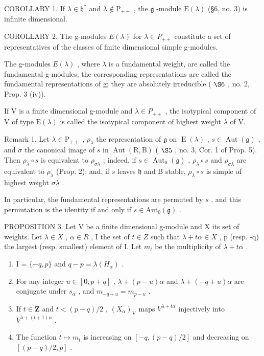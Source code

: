 COROLLARY 1. If \(\lambda \in \mathfrak{h}^*\) and \(\lambda \notin \mathrm{P}_{++}\) , the \(\mathfrak{g}\) -module \(\mathrm{E}(\lambda)\) (§6, no. 3) is infinite dimensional.

COROLLARY 2. The g-modules \(E(\lambda)\) for \(\lambda \in P_{++}\) constitute a set of representatives of the classes of finite dimensional simple g-modules.

The g-modules \(E(\lambda)\) , where \(\lambda\) is a fundamental weight, are called the fundamental g-modules; the corresponding representations are called the fundamental representations of g; they are absolutely irreducible ( \(\S6\) , no. 2, Prop. 3 (iv)).

If V is a finite dimensional g-module and \(\lambda\in P_{++}\) , the isotypical component of V of type \(\mathrm{E}(\lambda)\) is called the isotypical component of highest weight \(\lambda\) of V.

Remark 1. Let \(\lambda \in \mathrm{P}_{++}\) , \(\rho_{\lambda}\) the representation of \(\mathfrak{g}\) on \(\operatorname{E}(\lambda)\) , \(s \in \operatorname{Aut}(\mathfrak{g})\) , and \(\sigma\) the canonical image of \(s\) in \(\operatorname{Aut}(\mathrm{R},\mathrm{B})\) ( \(\S 5\) , no. 3, Cor. 1 of Prop. 5). Then \(\rho_{\lambda} \circ s\) is equivalent to \(\rho_{\sigma \lambda}\) ; indeed, if \(s \in \operatorname{Aut}_0(\mathfrak{g})\) , \(\rho_{\lambda} \circ s\) and \(\rho_{\sigma \lambda}\) are equivalent to \(\rho_{\lambda}\) (Prop. 2); and, if \(s\) leaves \(\mathfrak{h}\) and B stable, \(\rho_{\lambda} \circ s\) is simple of highest weight \(\sigma \lambda\) .

In particular, the fundamental representations are permuted by \(s\) , and this permutation is the identity if and only if \(s \in \mathrm{Aut}_0(\mathfrak{g})\) .

PROPOSITION 3. Let V be a finite dimensional g-module and X its set of weights. Let \(\lambda \in X\) , \(\alpha \in R\) , I the set of \(t \in Z\) such that \(\lambda + t\alpha \in X\) , p (resp. -q) the largest (resp. smallest) element of I. Let \(m_t\) be the multiplicity of \(\lambda + t\alpha\) .

\begin{enumerate}
\def\labelenumi{(\roman{enumi})}
\item
  I = \(\{-q, p\}\) and \(q - p = \lambda(H_{\alpha})\) .
\item
  For any integer \(u \in [0, p + q]\) , \(\lambda + (p - u)\alpha\) and \(\lambda + (-q + u)\alpha\) are conjugate under \(s_{\alpha}\) , and \(m_{-q + u} = m_{p - u}\) .
\item
  If \(t \in \mathbf{Z}\) and \(t < (p - q)/2\) , \((X_{\alpha})_{\mathrm{V}}\) maps \(V^{\lambda + t\alpha}\) injectively into \(V^{\lambda + (t + 1)\alpha}\) .
\item
  The function \(t \mapsto m_t\) is increasing on \([-q, (p - q)/2]\) and decreasing on \([(p - q)/2, p]\) .
\end{enumerate}

